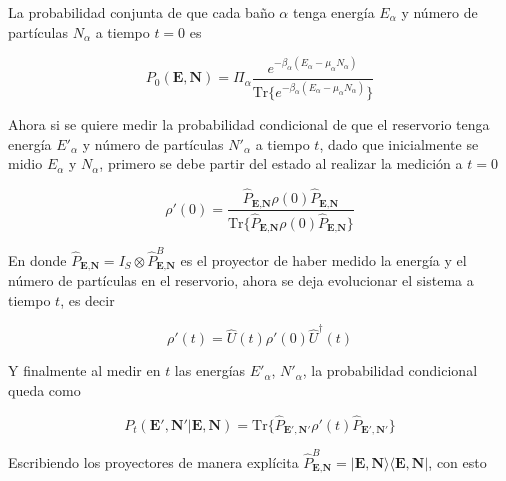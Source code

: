La probabilidad conjunta de que cada baño $\alpha$ tenga energía $E_{\alpha}$ y número de partículas $N_{\alpha}$ a tiempo $t=0$ es

\begin{equation*}
    P_{0}(\textbf{E},\textbf{N}) = \Pi_{\alpha}  \frac{e^{-\beta_{\alpha}(E_{\alpha} - \mu_{\alpha}N_{\alpha} )  }}{ \text{Tr}\{e^{-\beta_{\alpha}(E_{\alpha} - \mu_{\alpha}N_{\alpha} )  }\} } 
\end{equation*}

Ahora si se quiere medir la probabilidad condicional de que el reservorio tenga energía $E'_{\alpha}$ y número de partículas $N'_{\alpha}$ a tiempo $t$, dado que inicialmente se midio $E_{\alpha}$ y $N_{\alpha}$, primero se debe partir del estado al realizar la medición a $t=0$

\begin{equation*}
    \rho'(0) = \frac{\hat{P}_{\textbf{E}, \textbf{N} }\rho(0) \hat{P}_{\textbf{E}, \textbf{N} } }{\text{Tr}\{\hat{P}_{\textbf{E}, \textbf{N} }\rho(0) \hat{P}_{\textbf{E}, \textbf{N} } \} }
\end{equation*}

En donde $\hat{P}_{\textbf{E}, \textbf{N} } = I_{S} \otimes \hat{P}^{B}_{\textbf{E}, \textbf{N} }$ es el proyector de haber medido la energía y el número de partículas en el reservorio, ahora se deja evolucionar el sistema a tiempo $t$, es decir

\begin{equation*}
    \rho'(t) = \hat{U}(t)\rho'(0)\hat{U}^{\dagger}(t)
\end{equation*}

Y finalmente al medir en $t$ las energías $E'_{\alpha}$, $N'_{\alpha}$, la probabilidad condicional queda como

\begin{equation*}
    P_{t}(\textbf{E}',\textbf{N}'|\textbf{E},\textbf{N}) = \text{Tr}\{\hat{P}_{\textbf{E}', \textbf{N}' }\rho'(t) \hat{P}_{\textbf{E}', \textbf{N}' } \}
\end{equation*}

Escribiendo los proyectores de manera explícita $\hat{P}^{B}_{\textbf{E}, \textbf{N} } = |\textbf{E}, \textbf{N} \rangle\langle \textbf{E}, \textbf{N}|$, con esto 


